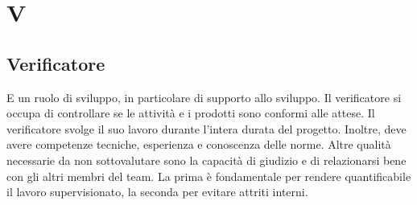 \section*{V}
\markright{}

\subsection*{Verificatore}
E un ruolo di sviluppo, in particolare di supporto allo sviluppo. Il verificatore si occupa di controllare se le attività e i prodotti sono conformi alle attese. Il verificatore svolge il suo lavoro durante l'intera durata del progetto. Inoltre, deve avere competenze tecniche, esperienza e conoscenza delle norme. Altre qualità necessarie da non sottovalutare sono la capacità di giudizio e di relazionarsi bene con gli altri membri del team. La prima è fondamentale per rendere quantificabile il lavoro supervisionato, la seconda per evitare attriti interni.
